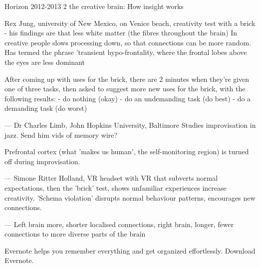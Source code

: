 Horizon 2012-2013 2 the creative brain: How insight works

Rex Jung, university of New Mexico, on Venice beach, creativity test with a brick - his findings are that less white matter (the fibres throughout the brain) In creative people slows processing down, so that connections can be more random. Has termed the phrase 'transient hypo-frontality, where the frontal lobes above the eyes are less dominant

After coming up with uses for the brick, there are 2 minutes when they're given one of three tasks, then asked to suggest more new uses for the brick, with the following results:
- do nothing (okay)
- do an undemanding task (do best)
- do a demanding task (do worst)


---
Dr Charles Limb, John Hopkins University, Baltimore
Studies improvisation in jazz. Send him vids of memory wire?

Prefrontal cortex (what 'makes us human', the self-monitoring region) is turned off during improvisation.

---
Simone Ritter Holland,
VR headset with VR that subverts normal expectations, then the 'brick' test, shows unfamiliar experiences increase creativity. 'Schema violation'  disrupts normal behaviour patterns, encourages new connections.

---
Left brain more, shorter localised connections, right brain, longer, fewer connections to more diverse parts of the brain


Evernote helps you remember everything and get organized effortlessly. Download Evernote.

